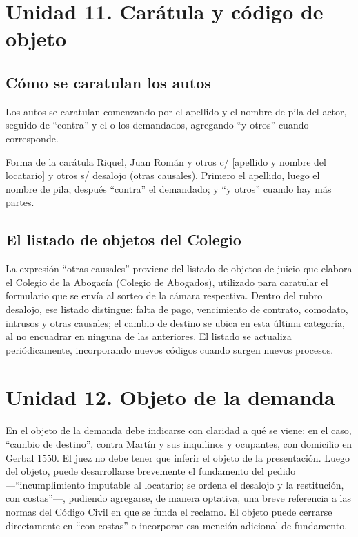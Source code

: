 \documentclass[12pt,oneside]{book}
\begin{document}
\section*{Unidad 11. Carátula y código de objeto}

\subsection*{Cómo se caratulan los autos}

Los autos se caratulan comenzando por el apellido y el nombre de pila del actor, seguido de ``contra'' y el o los demandados, agregando ``y otros'' cuando corresponde.

\begin{definition}{Forma de la carátula}
Riquel, Juan Román y otros c/ [apellido y nombre del locatario] y otros s/ desalojo (otras causales). Primero el apellido, luego el nombre de pila; después ``contra'' el demandado; y ``y otros'' cuando hay más partes.
\end{definition}

\subsection*{El listado de objetos del Colegio}

La expresión ``otras causales'' proviene del listado de objetos de juicio que elabora el Colegio de la Abogacía (Colegio de Abogados), utilizado para caratular el formulario que se envía al sorteo de la cámara respectiva. Dentro del rubro desalojo, ese listado distingue: falta de pago, vencimiento de contrato, comodato, intrusos y otras causales; el cambio de destino se ubica en esta última categoría, al no encuadrar en ninguna de las anteriores. El listado se actualiza periódicamente, incorporando nuevos códigos cuando surgen nuevos procesos.

\section*{Unidad 12. Objeto de la demanda}

En el objeto de la demanda debe indicarse con claridad a qué se viene: en el caso, ``cambio de destino'', contra Martín y sus inquilinos y ocupantes, con domicilio en Gerbal 1550. El juez no debe tener que inferir el objeto de la presentación. Luego del objeto, puede desarrollarse brevemente el fundamento del pedido —``incumplimiento imputable al locatario; se ordena el desalojo y la restitución, con costas''—, pudiendo agregarse, de manera optativa, una breve referencia a las normas del Código Civil en que se funda el reclamo. El objeto puede cerrarse directamente en ``con costas'' o incorporar esa mención adicional de fundamento.
\end{document}
